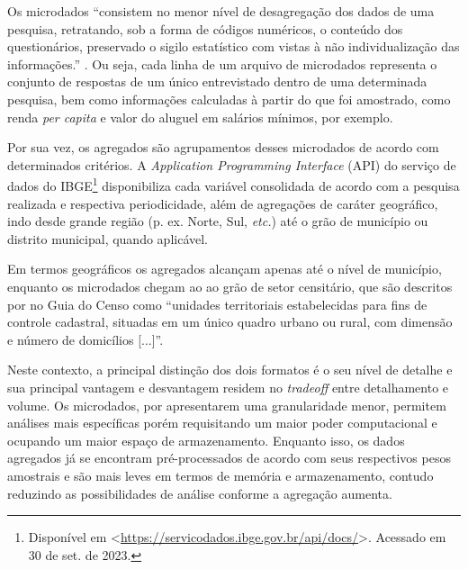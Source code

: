     Os microdados ``consistem no menor nível de desagregação dos dados de uma pesquisa, retratando, sob a forma de códigos numéricos, o conteúdo dos questionários, preservado o sigilo estatístico com vistas à não individualização das informações.'' \cite{microdados}. Ou seja, cada linha de um arquivo de microdados representa o conjunto de respostas de um único entrevistado dentro de uma determinada pesquisa, bem como informações calculadas à partir do que foi amostrado, como renda \textit{per capita} e valor do aluguel em salários mínimos, por exemplo.

    Por sua vez, os agregados são agrupamentos desses microdados de acordo com determinados critérios. A \textit{Application Programming Interface} (API) do serviço de dados do IBGE\footnote{Disponível em <\url{https://servicodados.ibge.gov.br/api/docs/}>. Acessado em 30 de set. de 2023.} disponibiliza cada variável consolidada de acordo com a pesquisa realizada e respectiva periodicidade, além de agregações de caráter geográfico, indo desde grande região (p. ex. Norte, Sul, \textit{etc.}) até o grão de município ou distrito municipal, quando aplicável.

    Em termos geográficos os agregados alcançam apenas até o nível de município, enquanto os microdados chegam ao ao grão de setor censitário, que são descritos por \textcite{Guia-Censo-2010} no Guia do Censo como ``unidades territoriais estabelecidas para fins de controle cadastral, situadas em um único quadro urbano ou rural, com dimensão e número de domicílios [...]''.

    Neste contexto, a principal distinção dos dois formatos é o seu nível de detalhe e sua principal vantagem e desvantagem residem no \textit{tradeoff} entre detalhamento e volume. Os microdados, por apresentarem uma granularidade menor, permitem análises mais específicas porém requisitando um maior poder computacional e ocupando um maior espaço de armazenamento. Enquanto isso, os dados agregados já se encontram pré-processados de acordo com seus respectivos pesos amostrais e são mais leves em termos de memória e armazenamento, contudo reduzindo as possibilidades de análise conforme a agregação aumenta.

    
